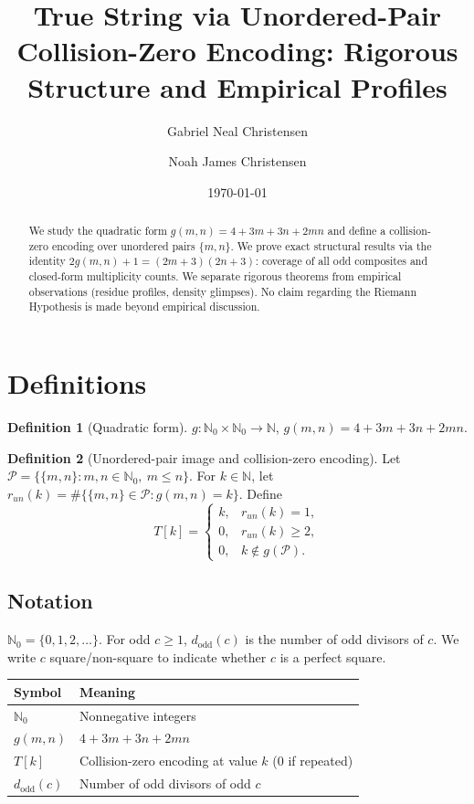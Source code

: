 \documentclass[12pt]{article}
\title{True String via Unordered-Pair Collision-Zero Encoding: Rigorous Structure and Empirical Profiles}
\author{Gabriel Neal Christensen \and Noah James Christensen}
\date{\today}
\theoremstyle{definition}
\newtheorem{definition}{Definition}[section]
\theoremstyle{plain}
\theoremstyle{remark}
\begin{document}
\maketitle

\begin{abstract}
We study the quadratic form \(g(m,n)=4+3m+3n+2mn\) and define a collision-zero encoding over unordered pairs \(\{m,n\}\). We prove exact structural results via the identity \(2g(m,n)+1=(2m+3)(2n+3)\): coverage of all odd composites and closed-form multiplicity counts. We separate rigorous theorems from empirical observations (residue profiles, density glimpses). No claim regarding the Riemann Hypothesis is made beyond empirical discussion.
\end{abstract}

\tableofcontents
\newpage

\section{Definitions}
\begin{definition}[Quadratic form]
\(g:\mathbb{N}_0\times\mathbb{N}_0\to\mathbb{N}\), \(g(m,n)=4+3m+3n+2mn\).
\end{definition}

\begin{definition}[Unordered-pair image and collision-zero encoding]
Let \(\mathcal{P}=\{\{m,n\}:m,n\in\mathbb{N}_0,\ m\le n\}\). For \(k\in\mathbb{N}\), let \(r_{un}(k)=\#\{\{m,n\}\in\mathcal{P}:g(m,n)=k\}\). Define
\[
T[k]=\begin{cases}k,& r_{un}(k)=1,\\0,& r_{un}(k)\ge 2,\\0,&k\notin g(\mathcal{P}).\end{cases}
\]
\end{definition}

\subsection*{Notation}
\(\mathbb{N}_0=\{0,1,2,\dots\}\). For odd \(c\ge 1\), \(d_{\mathrm{odd}}(c)\) is the number of odd divisors of \(c\). We write \(c\) square/non-square to indicate whether \(c\) is a perfect square.

\begin{center}
\begin{tabular}{l l}
Symbol & Meaning \\
\hline
\(\mathbb{N}_0\) & Nonnegative integers \\
\(g(m,n)\) & \(4+3m+3n+2mn\) \\
\(T[k]\) & Collision-zero encoding at value \(k\) (0 if repeated) \\
\(d_{\mathrm{odd}}(c)\) & Number of odd divisors of odd \(c\) \\
\end{tabular}
\end{center}
\end{document}
